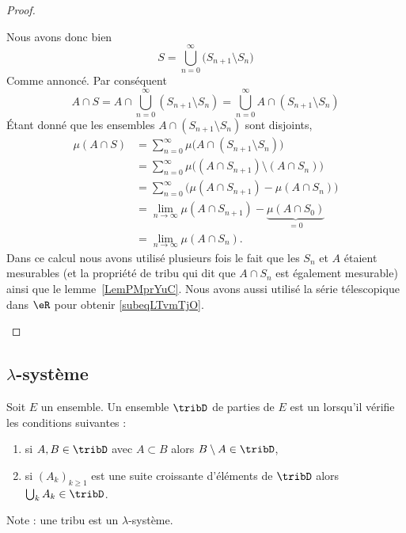\begin{proof}
\begin{subproof}
		Nous avons donc bien
		\begin{equation}
			S=\bigcup_{n=0}^{\infty}\big( S_{n+1}\setminus S_n \big)
		\end{equation}
		Comme annoncé.
		Par conséquent
		\begin{equation}
			A\cap S = A\cap\bigcup_{n=0}^{\infty}(S_{n+1}\setminus S_n)
			= \bigcup_{n=0}^{\infty}A\cap(S_{n+1}\setminus S_n)
		\end{equation}
		Étant donné que les ensembles \( A\cap(S_{n+1}\setminus S_n)\) sont disjoints,
		\begin{subequations}
			\begin{align}
				\mu(A\cap S) & =\sum_{n=0}^{\infty}\mu\big( A\cap(S_{n+1}\setminus S_n) \big)                                 \\
				             & =\sum_{n=0}^{\infty}\mu\Big( (A\cap S_{n+1})\setminus (A\cap S_n) \Big)                        \\
				             & =\sum_{n=0}^{\infty}\big( \mu(A\cap S_{n+1})-\mu(A\cap S_n) \big)                              \\
				             & =\lim_{n\to \infty} \mu(A\cap S_{n+1})-\underbrace{\mu(A\cap S_0)}_{=0}   \label{subeqLTvmTjO} \\
				             & =\lim_{n\to \infty} \mu(A\cap S_n).
			\end{align}
		\end{subequations}
		Dans ce calcul nous avons utilisé plusieurs fois le fait que les \( S_n\) et \( A\) étaient mesurables (et la propriété de tribu qui dit que \( A\cap S_n\) est également mesurable) ainsi que le lemme~\ref{LemPMprYuC}. Nous avons aussi utilisé la série télescopique dans \( \eR\) pour obtenir \eqref{subeqLTvmTjO}.
	\end{subproof}
\end{proof}


\subsection{\( \lambda\)-système}

\begin{definition}      \label{DefRECXooWwYgej}
	Soit \( E\) un ensemble. Un ensemble \( \tribD\) de parties de \( E\) est un  lorsqu'il vérifie les conditions suivantes :
	\begin{enumerate}
		\item
		      si \( A,B\in\tribD\) avec \( A\subset B\) alors \( B\setminus A\in \tribD\),
		\item
		      si \( (A_k)_{k\geq 1}\) est une suite croissante d'éléments de \( \tribD\) alors \( \bigcup_kA_k\in\tribD\).
	\end{enumerate}
\end{definition}
Note : une tribu est un \( \lambda\)-système.



